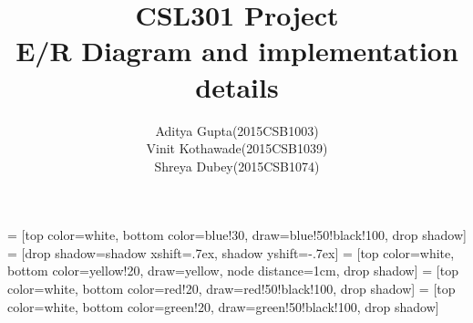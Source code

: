 \documentclass{beamer}
\begin{document}
\title{CSL301 Project\\E/R Diagram and implementation details}   
\author{Aditya Gupta(2015CSB1003) \\ Vinit Kothawade(2015CSB1039) \\ Shreya Dubey(2015CSB1074)}
\date{} 

\frame{\titlepage} 

 = [top color=white, bottom color=blue!30, 
                            draw=blue!50!black!100, drop shadow]
 = [drop shadow={shadow xshift=.7ex, 
                                 shadow yshift=-.7ex}]
 = [top color=white, bottom color=yellow!20, 
                               draw=yellow, node distance=1cm, drop shadow]
 = [top color=white, bottom color=red!20, 
                                  draw=red!50!black!100, drop shadow]
 = [top color=white, bottom color=green!20, 
                         draw=green!50!black!100, drop shadow]
\end{document}
